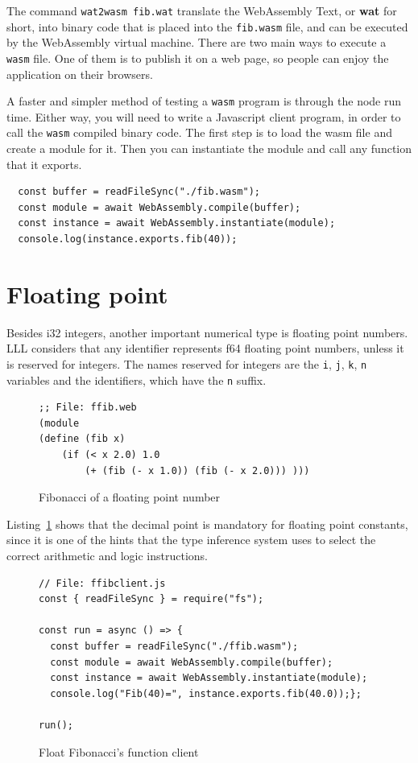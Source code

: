 \documentclass[a4paper,12pt]{book}
\begin{document}
The command \verb|wat2wasm fib.wat| translate the
WebAssembly Text, or {\bf wat} for short, into binary
code that is placed into the \verb|fib.wasm| file, and
can be executed by the WebAssembly virtual
machine. There are two main ways
to execute a \verb|wasm| file. One of them is to
publish it on a web page, so people can enjoy the
application on their browsers.

A faster and simpler method of testing a \verb|wasm|
program is through the node run time. Either way, you
will need to write a Javascript client program, in
order to call the \verb|wasm| compiled binary code.
The first step is to load the wasm file and create a
module for it. Then you can instantiate the module
and call any function that it exports.
\begin{verbatim}
  const buffer = readFileSync("./fib.wasm");
  const module = await WebAssembly.compile(buffer);
  const instance = await WebAssembly.instantiate(module);
  console.log(instance.exports.fib(40));
\end{verbatim}

\section{Floating point}
Besides i32 integers, another important numerical type
is floating point numbers. LLL considers that
any identifier represents f64 floating point numbers,
unless it is reserved for integers. The names
reserved for integers are the \verb|i|, \verb|j|,
\verb|k|, \verb|n| variables and the identifiers,
which have the \verb|n| suffix.

\begin{figure}[!h]
\begin{verbatim}
;; File: ffib.web
(module
(define (fib x)
    (if (< x 2.0) 1.0
        (+ (fib (- x 1.0)) (fib (- x 2.0))) )))
\end{verbatim}
  \caption{Fibonacci of a floating point number}
  \label{wasm:float-fibonacci}
\end{figure}

Listing~\ref{wasm:float-fibonacci} shows that the
decimal point is mandatory for floating point
constants, since it is one of the hints that the
type inference system uses to select the correct
arithmetic and logic instructions.

\begin{figure}[!h]
\begin{verbatim}
// File: ffibclient.js
const { readFileSync } = require("fs");

const run = async () => {
  const buffer = readFileSync("./ffib.wasm");
  const module = await WebAssembly.compile(buffer);
  const instance = await WebAssembly.instantiate(module);
  console.log("Fib(40)=", instance.exports.fib(40.0));};

run();
\end{verbatim}
  \caption{Float Fibonacci's function client}
  \label{wasm:ffibclient}
\end{figure}
\end{document}
